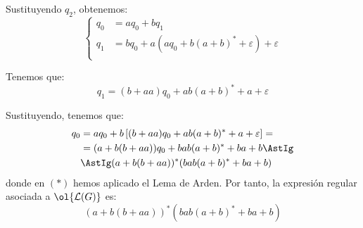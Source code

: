\begin{ejercicio}
    Sustituyendo $q_2$, obtenemos:
    \begin{equation*}
        \begin{cases}
            q_0 &= aq_0 + bq_1\\
            q_1 &= bq_0 + a(aq_0 + b(a+b)^* + \varepsilon) + \varepsilon\\
        \end{cases}
    \end{equation*}

    Tenemos que:
    \begin{equation*}
        q_1 = (b+aa)q_0 +ab(a+b)^* + a + \varepsilon
    \end{equation*}

    Sustituyendo, tenemos que:
    \begin{align*}
        q_0 &= aq_0 + b\left[(b+aa)q_0 +ab(a+b)^* + a + \varepsilon\right]
        =\\&= (a+b(b+aa))q_0 + bab(a+b)^* + ba + b
        \AstIg\\&\AstIg (a+b(b+aa))^*(bab(a+b)^* + ba + b)
    \end{align*}
    donde en $(\ast)$ hemos aplicado el Lema de Arden.
    Por tanto, la expresión regular asociada a $\ol{\cc{L}(G)}$ es:
    \begin{equation*}
        (a+b(b+aa))^*(bab(a+b)^* + ba + b)
    \end{equation*}
\end{ejercicio}

